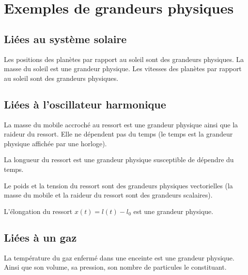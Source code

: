 \section{Exemples de grandeurs physiques}

\subsection{Liées au système solaire}

Les positions des planètes par rapport au soleil sont des grandeurs physiques. La masse du soleil est une grandeur physique. Les vitesses des planètes par rapport au soleil sont des grandeurs physiques.

\subsection{Liées à l'oscillateur harmonique}

La masse du mobile accroché au ressort est une grandeur physique ainsi que la raideur du ressort. Elle ne dépendent pas du temps (le temps est la grandeur physique affichée par une horloge).

\begin{center}

\end{center}

La longueur du ressort est une grandeur physique susceptible de dépendre du temps. 

\begin{center}

\end{center}

Le poids et la tension du ressort sont des grandeurs physiques vectorielles (la masse du mobile et la raideur du ressort sont des grandeurs scalaires).

L'élongation du ressort $x(t)=l(t)-l_0$ est une grandeur physique.


\subsection{Liées à un gaz}

La température du gaz enfermé dans une enceinte est une grandeur physique. Ainsi que son volume, sa pression, son nombre de particules le constituant.



